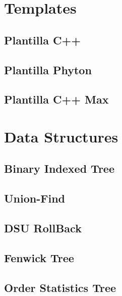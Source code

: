 \section{Templates}
\subsection{Plantilla C++}
\raggedbottom
\hrulefill
\subsection{Plantilla Phyton}
\raggedbottom
\hrulefill
\subsection{Plantilla C++ Max}
\raggedbottom
\hrulefill
\newpage

\section{Data Structures}
\subsection{Binary Indexed Tree}
\raggedbottom
\hrulefill
\subsection{Union-Find}
\raggedbottom
\hrulefill
\subsection{DSU RollBack}
\raggedbottom
\hrulefill
\subsection{Fenwick Tree}
\raggedbottom
\hrulefill
\subsection{Order Statistics Tree}
\raggedbottom
\hrulefill
